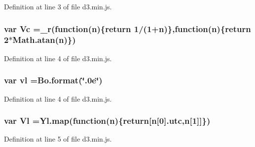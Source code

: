 Definition at line 3 of file d3.\+min.\+js.

\subsubsection[{Vc}]{\setlength{\rightskip}{0pt plus 5cm}var Vc ={\bf \+\_\+r}(function({\bf n})\{{\bf return} 1/(1+{\bf n})\},function({\bf n})\{{\bf return} 2$\ast$Math.\+atan({\bf n})\})}\label{d3_8min_8js_a62e4a1129291fdaf126edec80169f77e}


Definition at line 4 of file d3.\+min.\+js.

\subsubsection[{vl}]{\setlength{\rightskip}{0pt plus 5cm}var vl ={\bf Bo.\+format}(\char`\"{}.\+0e\char`\"{})}\label{d3_8min_8js_aea9e3062fb67f6b751e150ab280bb261}


Definition at line 4 of file d3.\+min.\+js.

\subsubsection[{Vl}]{\setlength{\rightskip}{0pt plus 5cm}var Vl ={\bf Yl.\+map}(function({\bf n})\{{\bf return}[{\bf n}[0].{\bf utc},{\bf n}[1]]\})}\label{d3_8min_8js_a1c65f4842d798309413ffe0d2252870b}


Definition at line 5 of file d3.\+min.\+js.

